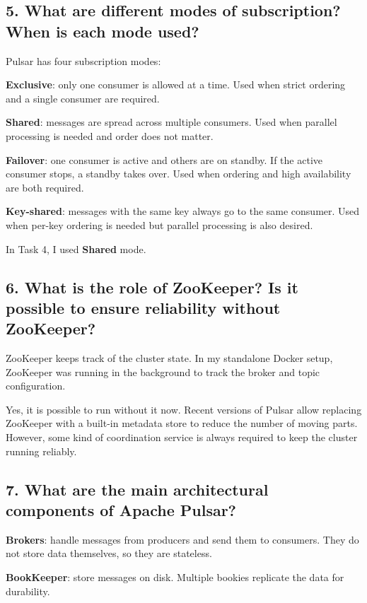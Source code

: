 \documentclass[11pt,a4paper]{article}
\begin{document}
\subsection*{5. What are different modes of subscription? When is each mode used?}

Pulsar has four subscription modes:

\textbf{Exclusive}: only one consumer is allowed at a time. Used when strict
        ordering and a single consumer are required.
  
 \textbf{Shared}: messages are spread across multiple consumers. Used when
        parallel processing is needed and order does not matter.

 \textbf{Failover}: one consumer is active and others are on standby. If the active
        consumer stops, a standby takes over. Used when ordering and high availability are both required.
  
\textbf{Key-shared}: messages with the same key always go to the same consumer.
        Used when per-key ordering is needed but parallel processing is also desired.


In Task 4, I used \textbf{Shared} mode. 

\subsection*{6. What is the role of ZooKeeper? Is it possible to ensure reliability without ZooKeeper?}

ZooKeeper keeps track of the cluster state. In my standalone Docker setup, ZooKeeper was running in the background to track the broker and topic configuration. 

Yes, it is possible to run without it now. 
Recent versions of Pulsar allow replacing ZooKeeper with a built-in metadata store to reduce the number of moving parts.
However, some kind of coordination service is always required to keep the cluster running reliably.

\subsection*{7. What are the main architectural components of Apache Pulsar?}

  \textbf{Brokers}: handle messages from producers and send them to consumers.
        They do not store data themselves, so they are stateless.

  \textbf{BookKeeper}: store messages on disk. Multiple bookies replicate
        the data for durability.
\end{document}
